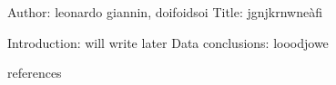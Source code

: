Author: leonardo giannin, doifoidsoi
Title: jgnjkrnwneàfi

Introduction: will write later
Data
conclusions: looodjowe


references 
